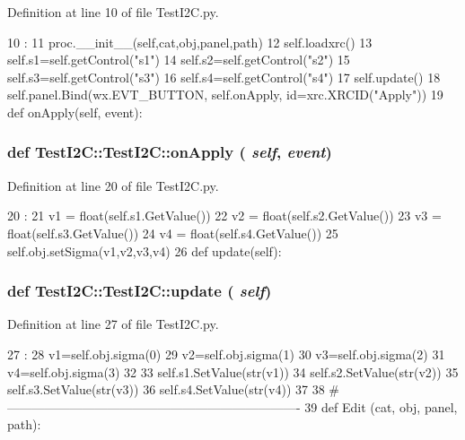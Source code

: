Definition at line 10 of file TestI2C.py.


\begin{DoxyCode}
10                                              :
11         proc.__init__(self,cat,obj,panel,path)
12         self.loadxrc()
13         self.s1=self.getControl("s1")
14         self.s2=self.getControl("s2")
15         self.s3=self.getControl("s3")
16         self.s4=self.getControl("s4")
17         self.update()
18         self.panel.Bind(wx.EVT_BUTTON, self.onApply, id=xrc.XRCID("Apply"))
19 
    def onApply(self, event):
\end{DoxyCode}
\hypertarget{classTestI2C_1_1TestI2C_af291b7193981a5fedac63f6d4b237755}{
\subsubsection[{onApply}]{\setlength{\rightskip}{0pt plus 5cm}def TestI2C::TestI2C::onApply ( {\em self}, \/   {\em event})}}
\label{classTestI2C_1_1TestI2C_af291b7193981a5fedac63f6d4b237755}


Definition at line 20 of file TestI2C.py.


\begin{DoxyCode}
20                             :
21         v1 = float(self.s1.GetValue())
22         v2 = float(self.s2.GetValue())
23         v3 = float(self.s3.GetValue())
24         v4 = float(self.s4.GetValue())
25         self.obj.setSigma(v1,v2,v3,v4)
26 
    def update(self):
\end{DoxyCode}
\hypertarget{classTestI2C_1_1TestI2C_a65a49c0918b5ec6475fcea5fa405d5fb}{
\subsubsection[{update}]{\setlength{\rightskip}{0pt plus 5cm}def TestI2C::TestI2C::update ( {\em self})}}
\label{classTestI2C_1_1TestI2C_a65a49c0918b5ec6475fcea5fa405d5fb}


Definition at line 27 of file TestI2C.py.


\begin{DoxyCode}
27                     :
28         v1=self.obj.sigma(0)
29         v2=self.obj.sigma(1)
30         v3=self.obj.sigma(2)
31         v4=self.obj.sigma(3)
32 
33         self.s1.SetValue(str(v1))
34         self.s2.SetValue(str(v2))
35         self.s3.SetValue(str(v3))
36         self.s4.SetValue(str(v4))        
37 
38 #----------------------------------------------------------------------
39 
def Edit (cat, obj, panel, path):
\end{DoxyCode}



